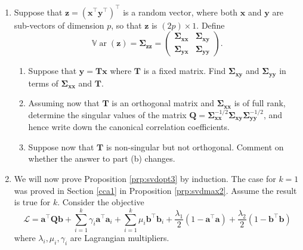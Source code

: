 \documentclass[
]{book}
\providecommand{\tightlist}{%
  \setlength{\itemsep}{0pt}\setlength{\parskip}{0pt}}
\theoremstyle{definition}
\theoremstyle{definition}
\theoremstyle{definition}
\theoremstyle{definition}
\theoremstyle{remark}
\begin{document}
\begin{enumerate}
\def\labelenumi{\arabic{enumi}.}
\setcounter{enumi}{1}
\tightlist
\item
  Suppose that \(\mathbf z= (\mathbf x^\top \mathbf y^\top)^\top\) is a random vector, where both \(\mathbf x\) and \(\mathbf y\) are sub-vectors of dimension \(p\), so that \(\mathbf z\) is \((2p)\times 1\). Define
  \[{\mathbb{V}\operatorname{ar}}(\mathbf z)=\boldsymbol{\Sigma}_{\mathbf z\mathbf z}=\begin{pmatrix} \boldsymbol{\Sigma}_{\mathbf x\mathbf x} & \boldsymbol{\Sigma}_{\mathbf x\mathbf y}\\\boldsymbol{\Sigma}_{\mathbf y\mathbf x} & \boldsymbol{\Sigma}_{\mathbf y\mathbf y}  \end{pmatrix}.\]

  \begin{enumerate}
  \def\labelenumii{\roman{enumii}.}
  \tightlist
  \item
    Suppose that \(\mathbf y= \mathbf T\mathbf x\) where \(\mathbf T\) is a fixed matrix. Find \(\boldsymbol{\Sigma}_{\mathbf x\mathbf y}\) and \(\boldsymbol{\Sigma}_{\mathbf y\mathbf y}\) in terms of \(\boldsymbol{\Sigma}_{\mathbf x\mathbf x}\) and \(\mathbf T\).
  \item
    Assuming now that \(\mathbf T\) is an orthogonal matrix and \(\boldsymbol{\Sigma}_{\mathbf x\mathbf x}\) is of full rank, determine the singular values of the matrix \(\mathbf Q=\boldsymbol{\Sigma}_{\mathbf x\mathbf x}^{-1/2}\boldsymbol{\Sigma}_ {\mathbf x\mathbf y}\boldsymbol{\Sigma}_{\mathbf y\mathbf y}^{-1/2}\), and hence write down the canonical correlation coefficients.
  \item
    Suppose now that \(\mathbf T\) is non-singular but not orthogonal. Comment on whether the answer to part (b) changes.
  \end{enumerate}
\item
  We will now prove Proposition \ref{prp:svdopt3} by induction.
  The case for \(k=1\) was proved in Section \ref{cca1} in Proposition \ref{prp:svdmax2}. Assume the result is true for \(k\). Consider the objective
  \[\mathcal{L} = \mathbf a^\top \mathbf Q\mathbf b+ \sum_{i=1}^k \gamma_i\mathbf a^\top \mathbf a_i + \sum_{i=1}^k \mu_i\mathbf b^\top \mathbf b_i + \frac{\lambda_1}{2}(1-\mathbf a^\top\mathbf a)+ \frac{\lambda_2}{2}(1-\mathbf b^\top\mathbf b)\]
  where \(\lambda_i, \mu_i, \gamma_i\) are Lagrangian multipliers.


\end{enumerate}
\end{document}
